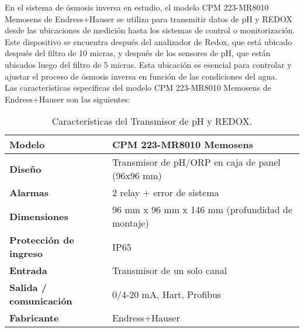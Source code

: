 En el sistema de ósmosis inversa en estudio, el modelo CPM 223-MR8010 Memosens de Endress+Hauser se utiliza para transmitir datos de pH y REDOX desde las ubicaciones de medición hasta los sistemas de control o monitorización. Este dispositivo se encuentra después del analizador de Redox, que está ubicado después del filtro de 10 micras, y después de los sensores de pH, que están ubicados luego del filtro de 5 micras. Esta ubicación es esencial para controlar y ajustar el proceso de ósmosis inversa en función de las condiciones del agua.\\

Las características específicas del modelo CPM 223-MR8010 Memosens de Endress+Hauser son las siguientes:\\



\begin{table}[H]
    \centering
    \caption{Características del Transmisor de pH y REDOX.}
    \label{table:transmisor_pH}
    \begin{tabular}{| L{5cm} | L{5cm} |}
        
        \hline
        \textbf{Modelo} & CPM 223-MR8010 Memosens  \\
        \hline
      
        \textbf{Diseño} & Transmisor de pH/ORP en caja de panel (96x96 mm)  \\
        \hline
        \textbf{Alarmas} & 2 relay + error de sistema  \\
        \hline
        \textbf{Dimensiones} & 96 mm x 96 mm x 146 mm (profundidad de montaje)  \\
        \hline
        \textbf{Protección de ingreso} & IP65  \\
        \hline
        \textbf{Entrada} & Transmisor de un solo canal  \\
        \hline
        \textbf{Salida / comunicación} & 0/4-20 mA, Hart, Profibus  \\
        \hline
       
        \textbf{Fabricante} & Endress+Hauser  \\
        \hline
    \end{tabular}
\end{table}

